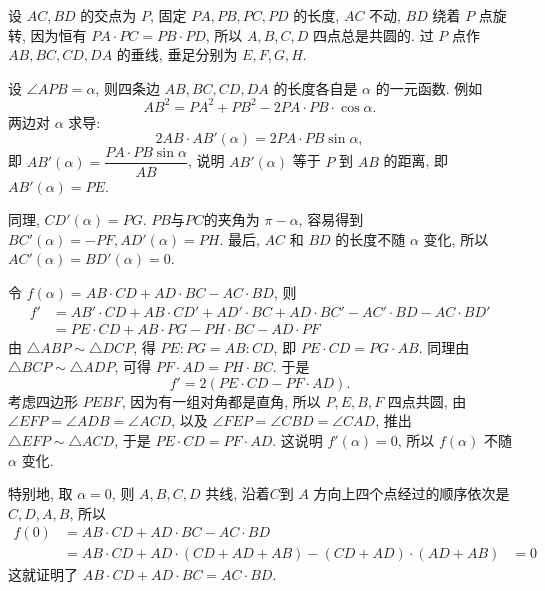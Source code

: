 设 $AC, BD$ 的交点为 $P$, 固定 $PA,PB,PC,PD$ 的长度, $AC$ 不动, $BD$ 绕着 $P$ 点旋转, 因为恒有 $PA\cdot PC = PB\cdot PD$, 所以 $A,B,C,D$ 四点总是共圆的. 过 $P$ 点作 $AB,BC,CD,DA$ 的垂线, 垂足分别为 $E,F,G,H$.

设 $\angle APB = \alpha$, 则四条边 $AB,BC,CD,DA$ 的长度各自是 $\alpha$ 的一元函数. 例如
\[ AB^2 = PA^2 + PB^2 - 2PA\cdot PB\cdot\cos\alpha .\]
两边对 $\alpha$ 求导:
\[2AB\cdot AB'(\alpha) = 2PA\cdot PB\sin\alpha ,\]
即 $AB'(\alpha) = \dfrac{PA\cdot PB\sin\alpha}{AB}$, 说明 $AB'(\alpha)$ 等于 $P$ 到 $AB$ 的距离, 即 $AB'(\alpha) = PE$. 

同理, $CD'(\alpha)=PG$. $PB$与$PC$的夹角为 $\pi-\alpha$, 容易得到 $BC'(\alpha)=-PF, AD'(\alpha)=PH$.
最后, $AC$ 和 $BD$ 的长度不随 $\alpha$ 变化, 所以 $AC'(\alpha)=BD'(\alpha)=0$.

令 $f(\alpha) = AB\cdot CD + AD\cdot BC - AC\cdot BD$, 则
\begin{align*} f' &= AB'\cdot CD +AB\cdot CD'+ AD'\cdot BC +AD\cdot BC' - AC'\cdot BD-AC\cdot BD'\\
&= PE\cdot CD + AB\cdot PG - PH\cdot BC - AD\cdot PF
\end{align*}
由 $\triangle ABP \sim \triangle DCP$, 得 $PE:PG = AB:CD$, 即 $PE\cdot CD = PG\cdot AB$. 同理由 $\triangle BCP \sim \triangle ADP$, 可得 $PF\cdot AD = PH\cdot BC$. 于是
\[ f' = 2(PE\cdot CD - PF\cdot AD) .\]
考虑四边形 $PEBF$, 因为有一组对角都是直角, 所以 $P,E,B,F$ 四点共圆, 由 $\angle EFP = \angle ADB = \angle ACD$, 以及 $\angle FEP = \angle CBD = \angle CAD$, 推出 $\triangle EFP\sim\triangle ACD$, 于是 $PE\cdot CD = PF\cdot AD$. 这说明 $f'(\alpha) = 0$, 所以 $f(\alpha)$ 不随 $\alpha$ 变化.

特别地, 取 $\alpha = 0$, 则 $A,B,C,D$ 共线, 沿着$C$到 $A$ 方向上四个点经过的顺序依次是 $C,D,A,B$, 所以
\begin{align*}
f(0) &= AB\cdot CD + AD\cdot BC - AC\cdot BD\\
&= AB\cdot CD + AD\cdot(CD+AD+AB) - (CD+AD)\cdot(AD+AB)
&=0
\end{align*}
这就证明了 $AB\cdot CD + AD\cdot BC = AC\cdot BD$.

~

